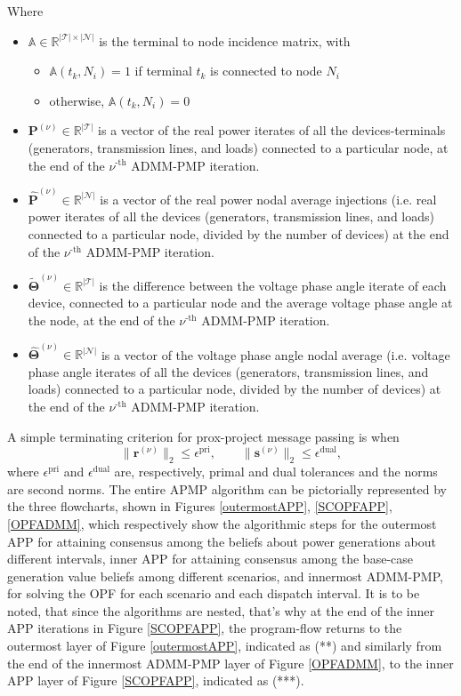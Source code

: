 \documentclass[preprint,12pt,3p]{elsarticle}
\begin{document}
Where \begin{itemize}
    \item $\mathbb{A}\in\mathbb{R}^{|\mathcal{T}|\times|\mathcal{N}|}$ is the terminal to node incidence matrix, with 
    \begin{itemize}
        \item $\mathbb{A}(t_k,N_i)=1$ if terminal $t_k$ is connected to node $N_i$
        \item otherwise, $\mathbb{A}(t_k,N_i)=0$
    \end{itemize}
    \item ${\mathbf{P}}^{(\nu)}\in\mathbb{R}^{|\mathcal{T}|}$ is a vector of the real power iterates of all the devices-terminals (generators, transmission lines, and loads) connected to a particular node, at the end of the $\nu^{\text{-th}}$ ADMM-PMP iteration.
    \item ${\hat{\mathbf{P}}}^{(\nu)}\in\mathbb{R}^{|\mathcal{N}|}$ is a vector of the real power nodal average injections (i.e. real power iterates of all the devices (generators, transmission lines, and loads) connected to a particular node, divided by the number of devices) at the end of the $\nu^{\text{-th}}$ ADMM-PMP iteration.
    \item $\tilde{\mathbf{\Theta}}^{(\nu)}\in\mathbb{R}^{|\mathcal{T}|}$ is the difference between the voltage phase angle iterate of each device, connected to a particular node and the average voltage phase angle at the node, at the end of the $\nu^{\text{-th}}$ ADMM-PMP iteration.
    \item ${\hat{\mathbf{\Theta}}}^{(\nu)}\in\mathbb{R}^{|\mathcal{N}|}$ is a vector of the voltage phase angle nodal average (i.e. voltage phase angle iterates of all the devices (generators, transmission lines, and loads) connected to a particular node, divided by the number of devices) at the end of the $\nu^{\text{-th}}$ ADMM-PMP iteration.
\end{itemize}
A simple terminating criterion for prox-project message passing is when
\[
\| {\mathbf{r}}^{(\nu)} \|_2 \leq \epsilon^\mathrm{pri}, \qquad \|{\mathbf{s}}^{(\nu)}\|_2 \leq \epsilon^\mathrm{dual},
\]
where $\epsilon^\mathrm{pri}$ and $\epsilon^\mathrm{dual}$ are,
respectively, primal and dual tolerances and the norms are second norms. The entire APMP algorithm can be pictorially represented by the three flowcharts, shown in Figures \ref{outermostAPP}, \ref{SCOPFAPP}, \ref{OPFADMM}, which respectively show the algorithmic steps for the outermost APP for attaining consensus among the beliefs about power generations about different intervals, inner APP for attaining consensus among the base-case generation value beliefs among different scenarios, and innermost ADMM-PMP, for solving the OPF for each scenario and each dispatch interval. It is to be noted, that since the algorithms are nested, that's why at the end of the inner APP iterations in Figure \ref{SCOPFAPP}, the program-flow returns to the outermost layer of Figure \ref{outermostAPP}, indicated as (**) and similarly from the end of the innermost ADMM-PMP layer of Figure \ref{OPFADMM}, to the inner APP layer of Figure \ref{SCOPFAPP}, indicated as (***).
\end{document}
